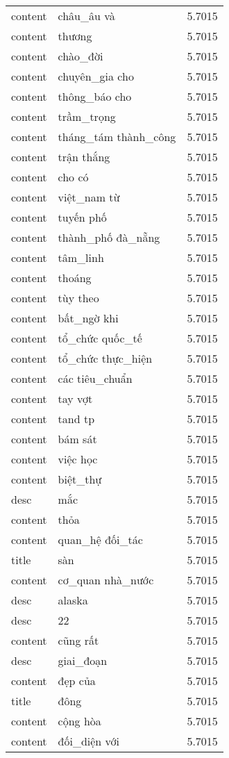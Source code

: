 \documentclass{article}
\begin{document}
\begin{tabular}{lll}
content & châu\_âu và & 5.7015\\
content & thương & 5.7015\\
content & chào\_đời & 5.7015\\
content & chuyên\_gia cho & 5.7015\\
content & thông\_báo cho & 5.7015\\
content & trầm\_trọng & 5.7015\\
content & tháng\_tám thành\_công & 5.7015\\
content & trận thắng & 5.7015\\
content & cho có & 5.7015\\
content & việt\_nam từ & 5.7015\\
content & tuyến phố & 5.7015\\
content & thành\_phố đà\_nẵng & 5.7015\\
content & tâm\_linh & 5.7015\\
content & thoáng & 5.7015\\
content & tùy theo & 5.7015\\
content & bất\_ngờ khi & 5.7015\\
content & tổ\_chức quốc\_tế & 5.7015\\
content & tổ\_chức thực\_hiện & 5.7015\\
content & các tiêu\_chuẩn & 5.7015\\
content & tay vợt & 5.7015\\
content & tand tp & 5.7015\\
content & bám sát & 5.7015\\
content & việc học & 5.7015\\
content & biệt\_thự & 5.7015\\
desc & mắc & 5.7015\\
content & thỏa & 5.7015\\
content & quan\_hệ đối\_tác & 5.7015\\
title & sàn & 5.7015\\
content & cơ\_quan nhà\_nước & 5.7015\\
desc & alaska & 5.7015\\
desc & 22 & 5.7015\\
content & cũng rất & 5.7015\\
desc & giai\_đoạn & 5.7015\\
content & đẹp của & 5.7015\\
title & đông & 5.7015\\
content & cộng hòa & 5.7015\\
content & đối\_diện với & 5.7015\\

\end{tabular}
\end{document}
